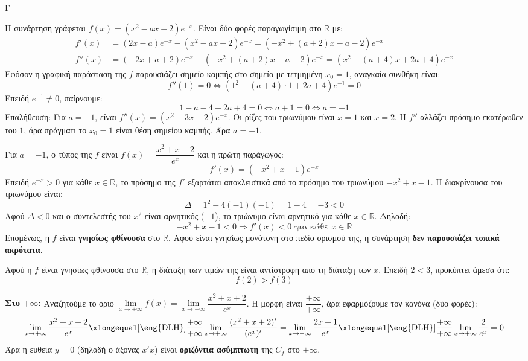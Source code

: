 \begin{thema}{Γ}
\begin{erwthma}
\item Η συνάρτηση γράφεται $f(x)=\left(x^2-ax+2\right)e^{-x}$. Είναι δύο φορές παραγωγίσιμη στο $\mathbb{R}$ με:
\begin{align*}
f'(x) &= (2x-a)e^{-x} - \left(x^2-ax+2\right)e^{-x} = \left(-x^2+(a+2)x-a-2\right)e^{-x} \\
f''(x) &= (-2x+a+2)e^{-x} - \left(-x^2+(a+2)x-a-2\right)e^{-x} = \left(x^2-(a+4)x+2a+4\right)e^{-x}
\end{align*}
Εφόσον η γραφική παράσταση της $f$ παρουσιάζει σημείο καμπής στο σημείο με τετμημένη $x_0=1$, αναγκαία συνθήκη είναι:
\[f''(1)=0 \Leftrightarrow \left(1^2-(a+4)\cdot 1+2a+4\right)e^{-1}=0\]
Επειδή $e^{-1}\neq 0$, παίρνουμε:
\[1-a-4+2a+4=0 \Leftrightarrow a+1=0 \Leftrightarrow a=-1\]
Επαλήθευση: Για $a=-1$, είναι $f''(x)=\left(x^2-3x+2\right)e^{-x}$. Οι ρίζες του τριωνύμου είναι $x=1$ και $x=2$. Η $f''$ αλλάζει πρόσημο εκατέρωθεν του $1$, άρα πράγματι το $x_0=1$ είναι θέση σημείου καμπής. Άρα $a=-1$.

\item Για $a=-1$, ο τύπος της $f$ είναι $f(x)=\dfrac{x^2+x+2}{e^x}$ και η πρώτη παράγωγος:
\[f'(x)=\left(-x^2+x-1\right)e^{-x}\]
Επειδή $e^{-x}>0$ για κάθε $x\in\mathbb{R}$, το πρόσημο της $f'$ εξαρτάται αποκλειστικά από το πρόσημο του τριωνύμου $-x^2+x-1$.
Η διακρίνουσα του τριωνύμου είναι:
\[\Delta=1^2-4(-1)(-1)=1-4=-3<0\]
Αφού $\Delta<0$ και ο συντελεστής του $x^2$ είναι αρνητικός ($-1$), το τριώνυμο είναι αρνητικό για κάθε $x\in\mathbb{R}$. Δηλαδή:
\[-x^2+x-1<0 \Rightarrow f'(x)<0 \text{ για κάθε } x\in\mathbb{R}\]
Επομένως, η $f$ είναι \textbf{γνησίως φθίνουσα} στο $\mathbb{R}$. Αφού είναι γνησίως μονότονη στο πεδίο ορισμού της, η συνάρτηση \textbf{δεν παρουσιάζει τοπικά ακρότατα}.

\item Αφού η $f$ είναι γνησίως φθίνουσα στο $\mathbb{R}$, η διάταξη των τιμών της είναι αντίστροφη από τη διάταξη των $x$. Επειδή $2 < 3$, προκύπτει άμεσα ότι:
\[f(2) > f(3)\]

\item \textbf{Στο $+\infty$:}
Αναζητούμε το όριο $\lim\limits_{x\to+\infty}f(x)=\lim\limits_{x\to+\infty}\dfrac{x^2+x+2}{e^x}$. Η μορφή είναι $\dfrac{+\infty}{+\infty}$, άρα εφαρμόζουμε τον κανόνα  (δύο φορές):
\[\lim_{x\to+\infty}\frac{x^2+x+2}{e^x} \xlongequal[\text{\eng{DLH}}]{\frac{+\infty}{+\infty}} \lim_{x\to+\infty}\frac{(x^2+x+2)'}{(e^x)'} = \lim_{x\to+\infty}\frac{2x+1}{e^x} \xlongequal[\text{\eng{DLH}}]{\frac{+\infty}{+\infty}} \lim_{x\to+\infty}\frac{2}{e^x} = 0\]
Άρα η ευθεία \textbf{$y=0$} (δηλαδή ο άξονας $x'x$) είναι \textbf{οριζόντια ασύμπτωτη} της $C_f$ στο $+\infty$.


\end{erwthma}
\end{thema}
